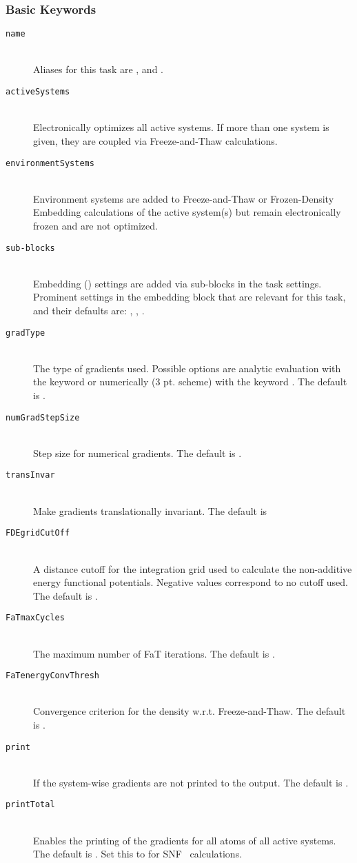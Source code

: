 \subsubsection{Basic Keywords}
\begin{description}
\item [\texttt{name}]\hfill \\
  Aliases for this task are ,  and .
\item [\texttt{activeSystems}]\hfill \\
  Electronically optimizes all active systems. If more than one system is given, they are coupled via Freeze-and-Thaw calculations.
\item [\texttt{environmentSystems}]\hfill \\
  Environment systems are added to Freeze-and-Thaw or Frozen-Density Embedding calculations of the active system(s) but remain electronically frozen and are not optimized.
\item [\texttt{sub-blocks}]\hfill \\
  Embedding () settings are added via sub-blocks in the task settings.
  Prominent settings in the embedding block that are relevant for this task, and their defaults are:
  , , .
\item [\texttt{gradType}]\hfill \\
  The type of gradients used. Possible options are analytic evaluation with the keyword  or numerically (3 pt. scheme) with the keyword . The default is .
\item [\texttt{numGradStepSize}]\hfill \\
  Step size for numerical gradients. The default is . 
\item [\texttt{transInvar}]\hfill \\
  Make gradients translationally invariant. The default is 
\item [\texttt{FDEgridCutOff}]\hfill \\
  A distance cutoff for the integration grid used to calculate the non-additive energy functional potentials. Negative values correspond to no cutoff used. The default is .
\item [\texttt{FaTmaxCycles}]\hfill \\
  The maximum number of FaT iterations. The default is .
\item [\texttt{FaTenergyConvThresh}]\hfill \\
  Convergence criterion for the density w.r.t. Freeze-and-Thaw. The default is .
\item [\texttt{print}]\hfill \\
  If  the system-wise gradients are not printed to the output. The default is .
\item [\texttt{printTotal}]\hfill \\
  Enables the printing of the gradients for all atoms of all active systems. The default is .
  Set this to  for \textsc{SNF}~\cite{SNF2002} calculations.
\end{description}
